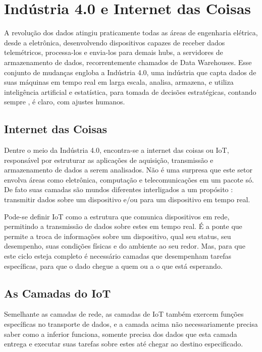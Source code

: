 \chapter{Indústria 4.0 e Internet das Coisas}
\label{chapter:industria_4_0_iot}

A revolução dos dados atingiu praticamente todas as áreas de engenharia elétrica, desde a eletrônica, desenvolvendo dispositivos capazes de receber dados telemétricos, processa-los e envia-los para demais hubs, a servidores de armazenamento de dados, recorrentemente chamados de Data Warehouses. Esse conjunto de mudanças engloba a Indústria 4.0, uma indústria que capta dados de suas máquinas em tempo real em larga escala, analisa, armazena, e utiliza inteligência artificial e estatística, para tomada de decisões estratégicas, contando sempre , é claro, com ajustes humanos.

\section{Internet das Coisas}
\label{section:iot}

Dentre o meio da Indústria 4.0, encontra-se a internet das coisas ou IoT, responsável por estruturar as aplicações de aquisição, transmissão e armazenamento de dados a serem analisados. Não é uma surpresa que este setor envolva áreas como eletrônica, computação e telecomunicações em um pacote só. De fato suas camadas são mundos diferentes interligados a um propósito : transmitir dados sobre um dispositivo e/ou para um dispositivo em tempo real.

Pode-se definir IoT como a estrutura que comunica dispositivos em rede, permitindo a transmissão de dados sobre estes em tempo real. É a ponte que permite a troca de informações sobre um dispositivo, qual seu status, seu desempenho, suas condições físicas e do ambiente ao seu redor. Mas, para que este ciclo esteja completo é necessário camadas que desempenham tarefas específicas, para que o dado chegue a quem ou a o que está esperando.

\section{As Camadas do IoT}
\label{section:camadas_iot}

Semelhante as camadas de rede, as camadas de IoT também exercem funções específicas no transporte de dados, e a camada acima não necessariamente precisa saber como a inferior funciona, somente precisa dos dados que esta camada entrega e executar suas tarefas sobre estes até chegar ao destino especificado.


